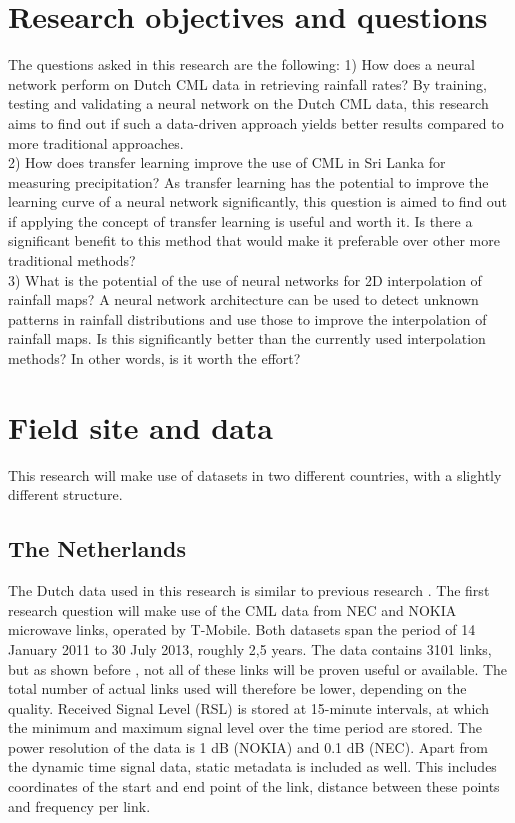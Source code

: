 \documentclass[twocolumn, 10pt, a4paper]{article}
\begin{document}
	
	\section{Research objectives and questions}
	
	The questions asked in this research are the following:
	1) How does a neural network perform on Dutch CML data in retrieving rainfall rates? By training, testing and validating a neural network on the Dutch CML data, this research aims to find out if such a data-driven approach yields better results compared to more traditional approaches.\\
	2) How does transfer learning improve the use of CML in Sri Lanka for measuring precipitation? As transfer learning has the potential to improve the learning curve of a neural network significantly, this question is aimed to find out if applying the concept of transfer learning is useful and worth it. Is there a significant benefit to this method that would make it preferable over other more traditional methods?\\
	3) What is the potential of the use of neural networks for 2D interpolation of rainfall maps? A neural network architecture can be used to detect unknown patterns in rainfall distributions and use those to improve the interpolation of rainfall maps. Is this significantly better than the currently used interpolation methods? In other words, is it worth the effort?\\
		
	\section{Field site and data}
	This research will make use of datasets in two different countries, with a slightly different structure.
	\subsection{The Netherlands}
	The Dutch data used in this research is similar to previous research \cite{Overeem2016}.
	The first research question will make use of the CML data from NEC and NOKIA microwave links, operated by T-Mobile. Both datasets span the period of 14 January 2011 to 30 July 2013, roughly 2,5 years. The data contains 3101 links, but as shown before \cite{Overeem2016}, not all of these links will be proven useful or available. The total number of actual links used will therefore be lower, depending on the quality. Received Signal Level (RSL)  is stored at 15-minute intervals, at which the minimum and maximum signal level over the time period are stored. The power resolution of the data is 1 dB (NOKIA) and 0.1 dB (NEC). 
	Apart from the dynamic time signal data, static metadata is included as well. This includes coordinates of the start and end point of the link, distance between these points and frequency per link.
	
\end{document}
